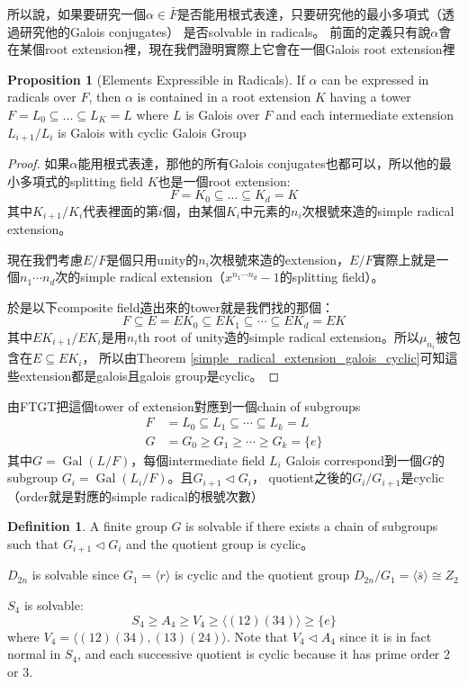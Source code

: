 \documentclass[12pt]{article}
\theoremstyle{definition}
\newtheorem{dfn}{Definition}
\newtheorem{prop}{Proposition}
\DeclareMathOperator{\Gal}{Gal}
\begin{document}
所以說，如果要研究一個$\alpha\in\bar{F}$是否能用根式表達，只要研究他的最小多項式（透過研究他的Galois conjugates）
是否solvable in radicals。
前面的定義只有說$\alpha$會在某個root extension裡，現在我們證明實際上它會在一個Galois root extension裡
\begin{prop}[Elements Expressible in Radicals]
	If $\alpha$ can be expressed in radicals over $F$, then $\alpha$ is contained in a root extension $K$ having
	a tower $F=L_0\subseteq ...\subseteq L_K=L$ where $L$ is Galois over $F$ and each intermediate extension $L_{i+1}/L_i$
	is Galois with cyclic Galois Group
\end{prop}

\begin{proof}
	如果$\alpha$能用根式表達，那他的所有Galois conjugates也都可以，所以他的最小多項式的splitting field $K$也是一個root extension:
	\[F=K_0\subseteq...\subseteq K_d=K\]
	其中$K_{i+1}/K_i$代表裡面的第$i$個，由某個$K_i$中元素的$n_i$次根號來造的simple radical extension。
	
	現在我們考慮$E/F$是個只用unity的$n_i$次根號來造的extension，$E/F$實際上就是一個$n_1\cdots n_d$次的simple radical extension（$x^{n_1\cdots n_d}-1$的splitting field）。

	於是以下composite field造出來的tower就是我們找的那個：
	\[F\subseteq E=EK_0\subseteq EK_1 \subseteq \cdots \subseteq EK_d = EK \]
	其中$EK_{i+1}/EK_i$是用$n_i$th root of unity造的simple radical extension。所以$\mu_{n_i}$被包含在$E\subseteq EK_i$，
	所以由Theorem \ref{simple_radical_extension_galois_cyclic}可知這些extension都是galois且galois group是cyclic。
\end{proof}
由FTGT把這個tower of extension對應到一個chain of subgroups
\begin{align*}
	F&=L_0\subseteq L_1\subseteq \cdots \subseteq L_k=L \\
	G&=G_0\ge G_1 \ge \cdots \ge G_k=\{e\}
\end{align*}
其中$G=\Gal(L/F)$，每個intermediate field $L_i$ Galois correspond到一個$G$的subgroup $G_i=\Gal(L_i/F)$。且$G_{i+1}\lhd G_i$，
quotient之後的$G_i/G_{i+1}$是cyclic（order就是對應的simple radical的根號次數）

\begin{dfn}
	A finite group $G$ is solvable if there exists a chain of subgroups such that $G_{i+1}\lhd G_i$ and the quotient group is cyclic。
\end{dfn}

\begin{ex}
	$D_{2n}$ is solvable since $G_1=\langle r \rangle$ is cyclic and the quotient group $D_{2n}/G_1=\langle \bar{s}\rangle\cong Z_2$ 
\end{ex}

\begin{ex}
	$S_4$ is solvable:
	\[S_4\ge A_4 \ge V_4 \ge \langle(12)(34)\rangle\ge\{e\}\]
	where $V_4=\langle(12)(34),(13)(24)\rangle$. Note that $V_4\lhd A_4$ since it is in fact normal in $S_4$,
	and each successive quotient is cyclic because it has prime order 2 or 3.
\end{ex}
\end{document}
